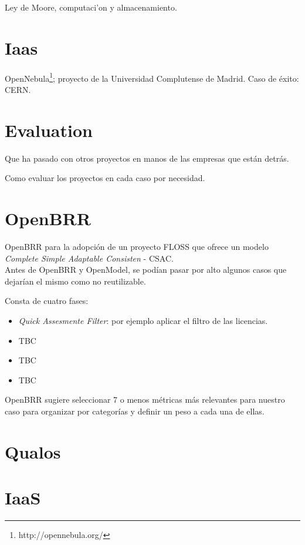 \documentclass[11pt]{scrartcl}
\begin{document}
Ley de Moore, computaci'on y almacenamiento.

\section{Iaas}

OpenNebula\footnote{http://opennebula.org/}; proyecto de la Universidad Complutense de Madrid. Caso de \'exito: CERN.

\section{Evaluation}

Que ha pasado con otros proyectos en manos de las empresas que est\'an detr\'as.

Como evaluar los proyectos en cada caso por necesidad.

\section{OpenBRR}

OpenBRR para la adopci\'on de un proyecto FLOSS que ofrece un modelo \emph{Complete Simple Adaptable Consisten} - CSAC. \\
Antes de OpenBRR y OpenModel, se pod\'ian pasar por alto algunos casos que dejar\'ian el mismo como no reutilizable.

Consta de cuatro fases:
\begin{itemize}
    \item \emph{Quick Assesmente Filter}: por ejemplo aplicar el filtro de las licencias.
    \item TBC
    \item TBC
    \item TBC
\end{itemize}

OpenBRR sugiere seleccionar 7 o menos m\'etricas m\'as relevantes para nuestro caso para organizar por categor\'ias y definir un peso a cada una de ellas. \\

\section{Qualos}

\section{IaaS}
\end{document}
